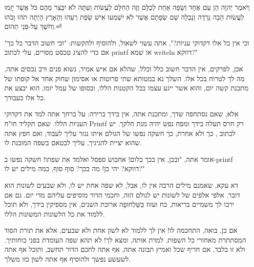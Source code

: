 \maketitle


\hfill

\begin{minipage}[l]{0.34688\textwidth}
וַיֹּאמֶר יְהוָה הֵן עַם אֶחָד וְשָׂפָה אַחַת לְכֻלָּם וְזֶה הַחִלָּם
לַעֲשׂוֹת וְעַתָּה לֹא יִבָּצֵר מֵהֶם כֹּל אֲשֶׁר יָזְמוּ לַעֲשׂוֹת
הָבָה נֵרְדָה וְנָבְלָה שָׁם שְׂפָתָם אֲשֶׁר לֹא יִשְׁמְעוּ אִישׁ שְׂפַת
רֵעֵהוּ וְהָאָרֶץ הָיְתָה תֹהוּ וָבֹהוּ וְחֹשֶׁךְ עַל-פְּנֵי תְהוֹם.⏎
\end{minipage}

"וכי אין כל אלו דקדוקי עניות?", אתה עשוי לשאול, ולהוסיף ולהקשות: "וכי חשוב הדבר
כל כך אם כדי להציג טכסט מסויים, עלי לכתוב printf או שמא writeln דווקא?"

אכן, לפרקים, אין הדבר חשוב כלל וכלל, שהלא אם איש אמיד, נשוא פנים ורב נכסים אתה,
מה לך לטרוח בכל אלו. השלך נא במטותא שתי פרוטות או אסימון שחוק אחד אל קופתו של
מתכנת קשה יום, והוא אשר ייגע עצמו בכל הקטנות הללו, ובסופו של עמל יומו, הוא יבצע
את כל אלו בעבורך.

אלא, שאם נסתחפה שדך, ומתכנת אתה, אין בידך ברירה: על כרחך אתה למד את דקדוקי
העניות הללו. שאם תקליד חו"ח Printf רק חרס תעלה בידך ומפח נפש יהיה מנת חלקך. יש
לכתוב , כך ולא אחרת, כך חשקה נפשו של הגולם איתו נגזר עליך לעבוד, ואם
חפץ אתה שהוא יציית להגיגיך, עליך לבטאם בשפה המובנת לו.

אומר אתה, "ובכן, אין בכך כלום! אחבוש ספסל ואלמד את שפתו! חשקה נפשו ב-printf
דווקא? יהי כן! מה בכך? סוף סוף, כמה מילים יש לו?"

דא עקא, שאמנם מילים הרבה אין לו, אבל, לא שפה אחת יש לו, ולא שבעים לשונות הוא
דובר. אלפי אלפים של לשונות יש לגולם הזה, וחכמי הדור מוסיפים עליהם מדי יום. גם
אם ירבו לך משמיים בריאות, כח ועזוז כַּשַּׁלְחוּפָה ארוכת השנים, אין מספיקין בידך, ולא
תוכל ללמוד את כל הלשונות המשונות הללו.

אם כן, בואה, התחכמה לו! אין לך ללמוד לא לשון אחת ולא שבעים,
אלא את תורת הסוד המסתתרת
מאחורי כל השפות. למדת אותה, ומצא לך! לא תהא שפה העומדת בפני כוחותיך. ולא זו
בלבד, אם חריף שכל ואמיץ תבונה אתה, אף אתה לחכם הדור תחשב, ותוכל אף אתה לשעשע
נפשך ולהוסיף אף אתה לשון כזו משלך.



\renewcommand\contentsname{תוכן העניינים}
\renewcommand\listfigurename{רשימת האיורים}
\renewcommand\listtablename{רשימת הטבלאות}

\cleardoublepage
{}
\dominitoc
\tableofcontents

\cleardoublepage
{}
\listoffigures

\cleardoublepage
{}
\listoftables

\cleardoublepage
{}

